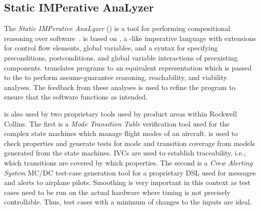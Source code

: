 \subsection{Static IMPerative AnaLyzer}

The {\em Static IMPerative AnaLyzer} (\simpal) is a tool for
performing compositional reasoning over
software~\cite{wagner2017spin}. \simpal is based on \limp, a \lustre-like imperative language with extensions for control flow elements, global variables, and a syntax for specifying preconditions, postconditions, and global variable interactions of
preexisting components. \simpal translates \limp programs to an
equivalent \lustre representation which is passed to the \jkind to
perform assume-guarantee reasoning, reachability, and viability
analyses. The feedback from these analyses is used to refine the
program to ensure that the software functions as intended.

\jkind is also used by two proprietary tools used by product areas within Rockwell Collins.  The first is a {\em Mode Transition Table} verification tool used for the complex state machines which manage flight modes of an aircraft.
\jkind is used to check properties and generate tests for mode and transition coverage from \lustre models generated from the state machines.
IVCs are used to establish traceability, i.e., which transitions are covered by which properties.  The second is a {\em Crew Alerting System} MC/DC test-case generation tool for a proprietary DSL used for messages and alerts to airplane pilots.  Smoothing is very important in this context as test cases need to be run on the actual hardware where
timing is not precisely controllable. Thus, test cases with a minimum
of changes to the inputs are ideal.
%
%

